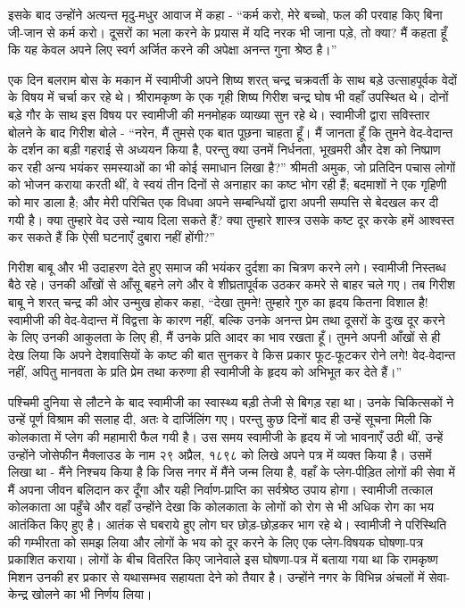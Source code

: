 इसके बाद उन्होंने अत्यन्त मृदु-मधुर आवाज में कहा - “कर्म करो, मेरे बच्चो, फल की परवाह किए बिना जी-जान से कर्म करो। दूसरों का भला करने के प्रयास में यदि नरक भी जाना पड़े, तो क्या? मैं कहता हूँ कि यह केवल अपने लिए स्वर्ग अर्जित करने की अपेक्षा अनन्त गुना श्रेष्ठ है।” 

\delimiter

एक दिन बलराम बोस के मकान में स्वामीजी अपने शिष्य शरत् चन्द्र चक्रवर्ती के साथ बड़े उत्साहपूर्वक वेदों के विषय में चर्चा कर रहे थे। श्रीरामकृष्ण के एक गृही शिष्य गिरीश चन्द्र घोष भी वहाँ उपस्थित थे। दोनों बड़े गौर के साथ इस विषय पर स्वामीजी की मनमोहक व्याख्या सुन रहे थे। स्वामीजी द्वारा सविस्तार बोलने के बाद गिरीश बोले - “नरेन, मैं तुमसे एक बात पूछना चाहता हूँ। मैं जानता हूँ कि तुमने वेद-वेदान्त के दर्शन का बड़ी गहराई से अध्ययन किया है, परन्तु क्या उनमें निर्धनता, भूखमरी और देश को निष्प्राण कर रही अन्य भयंकर समस्याओं का भी कोई समाधान लिखा है?” श्रीमती अमुक, जो प्रतिदिन पचास लोगों को भोजन कराया करती थीं, वे स्वयं तीन दिनों से अनाहार का कष्ट भोग रही हैं; बदमाशों ने एक गृहिणी को मार डाला है; और मेरी परिचित एक विधवा अपने सम्बन्धियों द्वारा अपनी सम्पत्ति से बेदखल कर दी गयी है। क्या तुम्हारे वेद उसे न्याय दिला सकते हैं? क्या तुम्हारे शास्त्र उसके कष्ट दूर करके हमें आश्वस्त कर सकते हैं कि ऐसी घटनाएँ दुबारा नहीं होंगी?” 

गिरीश बाबू और भी उदाहरण देते हुए समाज की भयंकर दुर्दशा का चित्रण करने लगे। स्वामीजी निस्तब्ध बैठे रहे। उनकी आँखों से आँसू बहने लगे और वे शीघ्रतापूर्वक उठकर कमरे से बाहर चले गए। तब गिरीश बाबू ने शरत् चन्द्र की ओर उन्मुख होकर कहा, “देखा तुमने! तुम्हारे गुरु का हृदय कितना विशाल है! स्वामीजी की वेद-वेदान्त में विद्वत्ता के कारण नहीं, बल्कि उनके अनन्त प्रेम तथा दूसरों के दुःख दूर करने के लिए उनकी आकुलता के लिए ही, मैं उनके प्रति आदर का भाव रखता हूँ। तुमने अपनी आँखों से ही देख लिया कि अपने देशवासियों के कष्ट की बात सुनकर वे किस प्रकार फूट-फूटकर रोने लगे! वेद-वेदान्त नहीं, अपितु मानवता के प्रति प्रेम तथा करुणा ही स्वामीजी के हृदय को अभिभूत कर देते हैं।” 

\vskip -6pt

\delimiter

पश्चिमी दुनिया से लौटने के बाद स्वामीजी का स्वास्थ्य बड़ी तेजी से बिगड़ रहा था। उनके चिकित्सकों ने उन्हें पूर्ण विश्राम की सलाह दी, अतः वे दार्जिलिंग गए। परन्तु कुछ दिनों बाद ही उन्हें सूचना मिली कि कोलकाता में प्लेग की महामारी फैल गयी है। उस समय स्वामीजी के हृदय में जो भावनाएँ उठी थीं, उन्हें उन्होंने जोसेफीन मैक्लाउड के नाम २९ अप्रैल, १८९८ को लिखे अपने पत्र में व्यक्त किया है। उसमें लिखा था - मैंने निश्चय किया है कि जिस नगर में मैंने जन्म लिया है, वहाँ के प्लेग-पीड़ित लोगों की सेवा में मैं अपना जीवन बलिदान कर दूँगा और यही निर्वाण-प्राप्ति का सर्वश्रेष्ठ उपाय होगा। स्वामीजी तत्काल कोलकाता आ पहुँचे और वहाँ उन्होंने देखा कि कोलकाता के लोगों को रोग से भी अधिक रोग का भय आतंकित किए हुए है। आतंक से घबराये हुए लोग घर छोड़-छोड़कर भाग रहे थे। स्वामीजी ने परिस्थिति की गम्भीरता को समझ लिया और लोगों के भय को दूर करने के लिए एक प्लेग-विषयक घोषणा-पत्र प्रकाशित कराया। लोगों के बीच वितरित किए जानेवाले इस घोषणा-पत्र में बताया गया था कि रामकृष्ण मिशन उनकी हर प्रकार से यथासम्भव सहायता देने को तैयार है। उन्होंने नगर के विभिन्न अंचलों में सेवा-केन्द्र खोलने का भी निर्णय लिया। 

